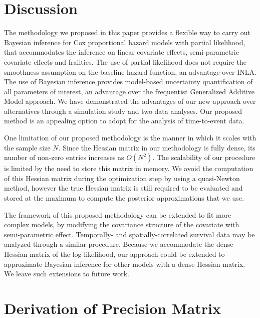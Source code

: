 \documentclass[serif,10pt]{wiley-article}
\begin{document}
\section{Discussion}\label{sec:discussion}

The methodology we proposed in this paper provides a flexible way to carry out Bayesian inference for Cox proportional hazard models with partial likelihood, that accommodates the inference on linear covariate effects, semi-parametric covariate effects and frailties. The use of partial likelihood does not require the smoothness assumption on the baseline hazard function, an advantage over INLA. The use of Bayesian inference provides model-based uncertainty quantification of all parameters of interest, an advantage over the frequentist Generalized Additive Model approach. We have demonstrated the advantages of our new approach over alternatives through a simulation study and two data analyses. Our proposed method is an appealing option to adopt for the analysis of time-to-event data.

One limitation of our proposed methodology is the manner in which it scales with the sample size $N$. Since the Hessian matrix in our methodology is fully dense, its number of non-zero entries increases as $O(N^{2})$. The scalability of our procedure is limited by the need to store this matrix in memory. We avoid the computation of this Hessian matrix during the optimization step by using a quasi-Newton method, however the true Hessian matrix is still required to be evaluated and stored at the maximum to compute the posterior approximations that we use.

The framework of this proposed methodology can be extended to fit more complex models, by modifying the covariance structure of the covariate with semi-parametric effect. Temporally- and spatially-correlated survival data may be analyzed through a similar procedure. Because we accommodate the dense Hessian matrix of the log-likelihood, our approach could be extended to approximate Bayesian inference for other models with a dense Hessian matrix. We leave such extensions to future work.



\appendix

\section{Derivation of Precision Matrix}
\end{document}
